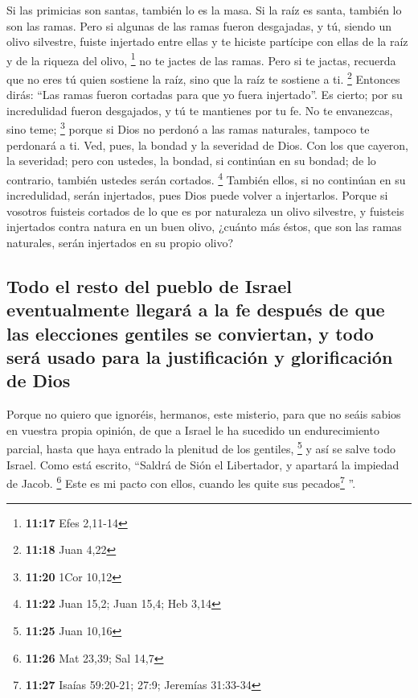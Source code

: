 \begin{paracol}{2}
 Si las primicias son santas, también lo es la masa. Si
la raíz es santa, también lo son las ramas.  Pero si
algunas de las ramas fueron desgajadas, y tú, siendo un olivo silvestre,
fuiste injertado entre ellas y te hiciste partícipe con ellas de la raíz
y de la riqueza del olivo, \footnote{\textbf{11:17} Efes 2,11-14}
 no te jactes de las ramas. Pero si te jactas, recuerda
que no eres tú quien sostiene la raíz, sino que la raíz te sostiene a
ti. \footnote{\textbf{11:18} Juan 4,22}  Entonces dirás:
``Las ramas fueron cortadas para que yo fuera injertado''.
 Es cierto; por su incredulidad fueron desgajados, y tú
te mantienes por tu fe. No te envanezcas, sino teme; \footnote{\textbf{11:20}
  1Cor 10,12}  porque si Dios no perdonó a las ramas
naturales, tampoco te perdonará a ti.  Ved, pues, la
bondad y la severidad de Dios. Con los que cayeron, la severidad; pero
con ustedes, la bondad, si continúan en su bondad; de lo contrario,
también ustedes serán cortados. \footnote{\textbf{11:22} Juan 15,2; Juan
  15,4; Heb 3,14}  También ellos, si no continúan en su
incredulidad, serán injertados, pues Dios puede volver a injertarlos.
 Porque si vosotros fuisteis cortados de lo que es por
naturaleza un olivo silvestre, y fuisteis injertados contra natura en un
buen olivo, ¿cuánto más éstos, que son las ramas naturales, serán
injertados en su propio olivo?

\hypertarget{todo-el-resto-del-pueblo-de-israel-eventualmente-llegaruxe1-a-la-fe-despuuxe9s-de-que-las-elecciones-gentiles-se-conviertan-y-todo-seruxe1-usado-para-la-justificaciuxf3n-y-glorificaciuxf3n-de-dios}{%
\subsection{Todo el resto del pueblo de Israel eventualmente llegará a
la fe después de que las elecciones gentiles se conviertan, y todo será
usado para la justificación y glorificación de
Dios}\label{todo-el-resto-del-pueblo-de-israel-eventualmente-llegaruxe1-a-la-fe-despuuxe9s-de-que-las-elecciones-gentiles-se-conviertan-y-todo-seruxe1-usado-para-la-justificaciuxf3n-y-glorificaciuxf3n-de-dios}}

 Porque no quiero que ignoréis, hermanos, este misterio,
para que no seáis sabios en vuestra propia opinión, de que a Israel le
ha sucedido un endurecimiento parcial, hasta que haya entrado la
plenitud de los gentiles, \footnote{\textbf{11:25} Juan 10,16}
 y así se salve todo Israel. Como está escrito, ``Saldrá
de Sión el Libertador, y apartará la impiedad de Jacob. \footnote{\textbf{11:26}
  Mat 23,39; Sal 14,7}  Este es mi pacto con ellos,
cuando les quite sus pecados\footnote{\textbf{11:27} Isaías 59:20-21;
  27:9; Jeremías 31:33-34} ''.


\end{paracol}
